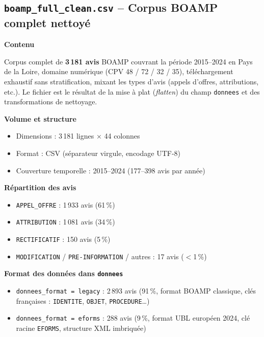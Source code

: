 \documentclass[12pt,a4paper]{article}
\begin{document}
\subsection{\texttt{boamp\_full\_clean.csv} -- Corpus BOAMP complet nettoyé}

\textbf{Contenu}

Corpus complet de \textbf{3\,181 avis} BOAMP couvrant la période 2015--2024 en
Pays de la Loire, domaine numérique (CPV 48 / 72 / 32 / 35), téléchargement
exhaustif sans stratification, mixant les types d'avis (appels d'offres,
attributions, etc.). Le fichier est le résultat de la mise à plat
(\textit{flatten}) du champ \texttt{donnees} et des transformations de
nettoyage.

\medskip
\textbf{Volume et structure}

\begin{itemize}
  \item[---] Dimensions : 3\,181 lignes × 44 colonnes
  \item[---] Format : CSV (séparateur virgule, encodage UTF-8)
  \item[---] Couverture temporelle : 2015--2024 (177--398 avis par année)
\end{itemize}

\medskip
\textbf{Répartition des avis}

\begin{itemize}
  \item[---] \texttt{APPEL\_OFFRE} : 1\,933 avis (61\,\%)
  \item[---] \texttt{ATTRIBUTION} : 1\,081 avis (34\,\%)
  \item[---] \texttt{RECTIFICATIF} : 150 avis (5\,\%)
  \item[---] \texttt{MODIFICATION} / \texttt{PRE-INFORMATION} / autres : 17 avis
    ($<$1\,\%)
\end{itemize}

\medskip
\textbf{Format des données dans \texttt{donnees}}

\begin{itemize}
  \item[---] \texttt{donnees\_format = legacy} : 2\,893 avis (91\,\%, format BOAMP
    classique, clés françaises : \texttt{IDENTITE}, \texttt{OBJET},
    \texttt{PROCEDURE}\ldots)
  \item[---] \texttt{donnees\_format = eforms} : 288 avis (9\,\%, format UBL
    européen 2024, clé racine \texttt{EFORMS}, structure XML imbriquée)
\end{itemize}
\end{document}
